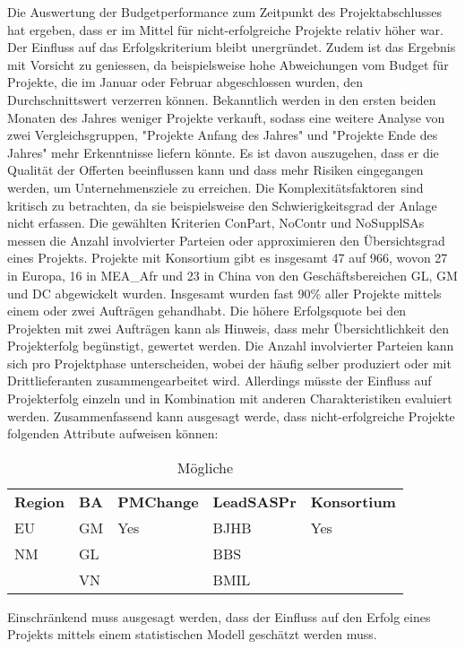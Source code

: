 \newline
Die Auswertung der Budgetperformance zum Zeitpunkt des Projektabschlusses hat ergeben, dass er im Mittel für nicht-erfolgreiche Projekte relativ höher war. Der Einfluss auf das Erfolgskriterium bleibt unergründet. Zudem ist das Ergebnis mit Vorsicht zu geniessen, da beispielsweise hohe Abweichungen vom Budget für Projekte, die im Januar oder Februar abgeschlossen wurden, den Durchschnittswert verzerren können. Bekanntlich werden in den ersten beiden Monaten des Jahres weniger Projekte verkauft, sodass eine weitere Analyse von zwei Vergleichsgruppen, "Projekte Anfang des Jahres" und "Projekte Ende des Jahres" mehr Erkenntnisse liefern könnte. Es ist davon auszugehen, dass er die Qualität der Offerten beeinflussen kann und dass mehr Risiken eingegangen werden, um Unternehmensziele zu erreichen. 
\newline 
Die Komplexitätsfaktoren sind kritisch zu betrachten, da sie beispielsweise den Schwierigkeitsgrad der Anlage nicht erfassen. Die gewählten Kriterien ConPart, NoContr und NoSupplSAs messen die Anzahl involvierter Parteien oder approximieren den Übersichtsgrad eines Projekts. Projekte mit Konsortium gibt es insgesamt 47 auf 966, wovon 27 in Europa, 16 in MEA\_Afr und  23 in China von den Geschäftsbereichen GL, GM und DC abgewickelt wurden. Insgesamt wurden fast 90\% aller Projekte mittels einem oder zwei Aufträgen gehandhabt. Die höhere Erfolgsquote bei den Projekten mit zwei Aufträgen kann als Hinweis, dass mehr Übersichtlichkeit den Projekterfolg begünstigt, gewertet werden. Die Anzahl involvierter Parteien kann sich pro Projektphase unterscheiden, wobei der häufig selber produziert oder mit Drittlieferanten zusammengearbeitet wird. Allerdings müsste der Einfluss auf Projekterfolg einzeln und in Kombination mit anderen Charakteristiken evaluiert werden. 
\newline
Zusammenfassend kann ausgesagt werde, dass nicht-erfolgreiche Projekte folgenden Attribute aufweisen können:
\begin{table}[H]
	\centering
	\caption{Mögliche}
	\begin{tabular}{rlrlr}
		\multicolumn{1}{l}{\textbf{Region}} & \textbf{BA} & \multicolumn{1}{l}{\textbf{PMChange}} & \textbf{LeadSASPr} & \multicolumn{1}{l}{\textbf{Konsortium}} \\
		\multicolumn{1}{l}{EU} & GM    & \multicolumn{1}{l}{Yes} & BJHB  & \multicolumn{1}{l}{Yes} \\
		\multicolumn{1}{l}{NM} & GL    &       & BBS   &  \\
		& VN    &       & BMIL  &  \\
	\end{tabular}%
	\label{tab:addlabel}%
\end{table}%
Einschränkend muss ausgesagt werden, dass der Einfluss auf den Erfolg eines Projekts mittels einem statistischen Modell geschätzt werden muss.  
\newpage